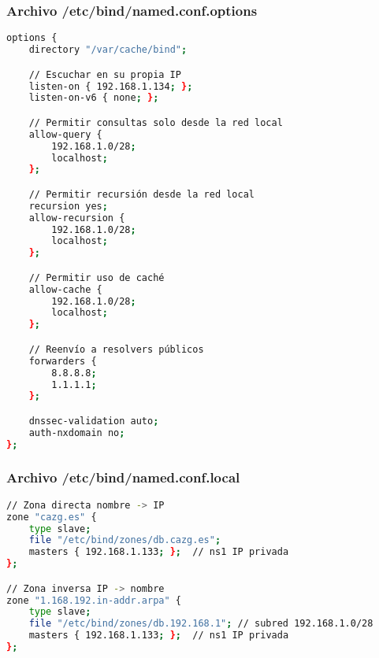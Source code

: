 \subsubsection*{Archivo /etc/bind/named.conf.options}
\begin{lstlisting}[language=bash]
options {
    directory "/var/cache/bind";

    // Escuchar en su propia IP
    listen-on { 192.168.1.134; };
    listen-on-v6 { none; };

    // Permitir consultas solo desde la red local
    allow-query {
        192.168.1.0/28;
        localhost;
    };

    // Permitir recursión desde la red local
    recursion yes;
    allow-recursion {
        192.168.1.0/28;
        localhost;
    };

    // Permitir uso de caché
    allow-cache {
        192.168.1.0/28;
        localhost;
    };

    // Reenvío a resolvers públicos
    forwarders {
        8.8.8.8;
        1.1.1.1;
    };

    dnssec-validation auto;
    auth-nxdomain no;
};
\end{lstlisting}

\subsubsection*{Archivo /etc/bind/named.conf.local}
\begin{lstlisting}[language=bash]
// Zona directa nombre -> IP
zone "cazg.es" {
    type slave;
    file "/etc/bind/zones/db.cazg.es";
    masters { 192.168.1.133; };  // ns1 IP privada
};

// Zona inversa IP -> nombre
zone "1.168.192.in-addr.arpa" {
    type slave;
    file "/etc/bind/zones/db.192.168.1"; // subred 192.168.1.0/28
    masters { 192.168.1.133; };  // ns1 IP privada
}; 
\end{lstlisting}

